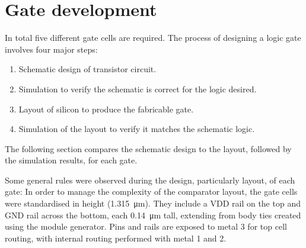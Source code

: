 \clearpage
\section{Gate development}

In total five different gate cells are required. The process of designing a logic gate involves four major steps:
\begin{enumerate}
    \item Schematic design of transistor circuit.
    \item Simulation to verify the schematic is correct for the logic desired.
    \item Layout of silicon to produce the fabricable gate. 
    \item Simulation of the layout to verify it matches the schematic logic.
\end{enumerate}
The following section compares the schematic design to the layout, followed by the simulation results, for each gate. 

Some general rules were observed during the design, particularly layout, of each gate: 
In order to manage the complexity of the comparator layout, the gate cells were standardised in height (\qty{1.315}{\um}).
They include a VDD rail on the top and GND rail across the bottom, each \qty{0.14}{\um} tall, 
extending from body ties created using the module generator.
Pins and rails are exposed to metal 3 for top cell routing, with internal routing performed with metal 1 and 2. 

